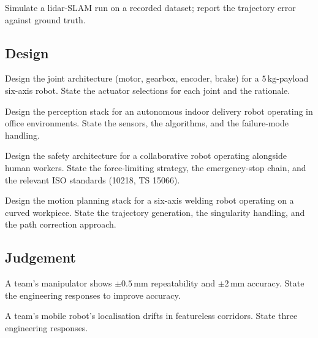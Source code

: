 \begin{exercise}
Simulate a lidar-SLAM run on a recorded dataset; report the trajectory error against ground truth.
\end{exercise}

\subsection*{Design}

\begin{exercise}
Design the joint architecture (motor, gearbox, encoder, brake) for a $5\,\text{kg}$-payload six-axis robot. State the actuator selections for each joint and the rationale.
\end{exercise}

\begin{exercise}
Design the perception stack for an autonomous indoor delivery robot operating in office environments. State the sensors, the algorithms, and the failure-mode handling.
\end{exercise}

\begin{exercise}
Design the safety architecture for a collaborative robot operating alongside human workers. State the force-limiting strategy, the emergency-stop chain, and the relevant ISO standards (10218, TS 15066).
\end{exercise}

\begin{exercise}
Design the motion planning stack for a six-axis welding robot operating on a curved workpiece. State the trajectory generation, the singularity handling, and the path correction approach.
\end{exercise}

\subsection*{Judgement}

\begin{exercise}
A team's manipulator shows $\pm 0.5\,\text{mm}$ repeatability and $\pm 2\,\text{mm}$ accuracy. State the engineering responses to improve accuracy.
\end{exercise}

\begin{exercise}
A team's mobile robot's localisation drifts in featureless corridors. State three engineering responses.
\end{exercise}

